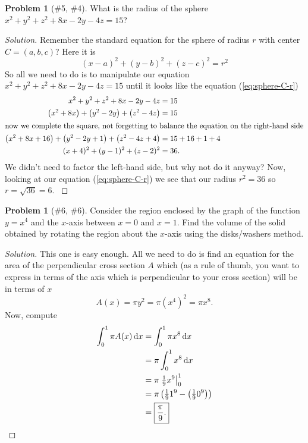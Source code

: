 \documentclass{article}
\theoremstyle{plain}
\theoremstyle{definition}
\newtheorem{problem}[exercise]{Problem}
\theoremstyle{remark}
\DeclareMathOperator{\diff}{d\!}
\begin{document}
\begin{problem}[{\color{Green}\#5}, {\color{Red}\#4}]
What is the radius of the sphere $x^2+y^2+z^2+8x-2y-4z=15$?
\end{problem}
\begin{proof}[Solution]
Remember the standard equation for the sphere of radius $r$ with center
$C=(a,b,c)$? Here it is
\begin{equation}
\label{eq:sphere-C-r}
(x-a)^2+(y-b)^2+(z-c)^2=r^2
\end{equation}
So all we need to do is to manipulate our equation
$x^2+y^2+z^2+8x-2y-4z=15$ until it looks like the equation
(\ref{eq:sphere-C-r})
\begingroup
\allowdisplaybreaks
\begin{align*}
x^2+y^2+z^2+8x-2y-4z&=15\\
\left(x^2+8x\right)
+\left(y^2-2y\right)
+\left(z^2-4z\right)&=15\\
\intertext{now we complete the square, not forgetting to balance the
  equation on the right-hand side}
\left(x^2+8x+16\right)
+\left(y^2-2y+1\right)
+\left(z^2-4z+4\right)&=15+16+1+4\\
(x+4)^2+(y-1)^2+(z-2)^2&=36.
\end{align*}
We didn't need to factor the left-hand side, but why not do it anyway? Now,
looking at our equation (\ref{eq:sphere-C-r}) we see that our radius
$r^2=36$ so $\boxed{r=\sqrt{36}=6}$.
\endgroup
\end{proof}

\begin{problem}[{\color{Green}\#6}, {\color{Red}\#6}]
Consider the region enclosed by the graph of the function $y=x^4$ and the
$x$-axis between $x=0$ and $x=1$. Find the volume of the solid obtained by
rotating the region about the $x$-axis using the disks/washers method.
\end{problem}
\begin{proof}[Solution]
This one is easy enough. All we need to do is find an equation for the area
of the perpendicular cross section $A$ which (as a rule of thumb, you want
to express in terms of the axis which is perpendicular to your cross
section) will be in terms of $x$
\[
A(x)=\pi y^2=\pi\left(x^4\right)^2=\pi x^8.
\]
Now, compute
\begingroup
\allowdisplaybreaks
\begin{align*}
\int_0^1\pi A(x)\diff x
&=\int_0^1\pi x^8\diff x\\
&=\pi\int_0^1 x^8\diff x\\
&=\pi\left.\tfrac{1}{9}x^9\right|_0^1\\
&=\pi\left(\tfrac{1}{9}1^9-\left(\tfrac{1}{9}0^9\right)\right)\\
&=\boxed{\frac{\pi}{9}.}\qedhere
\end{align*}
\endgroup
\end{proof}
\end{document}
